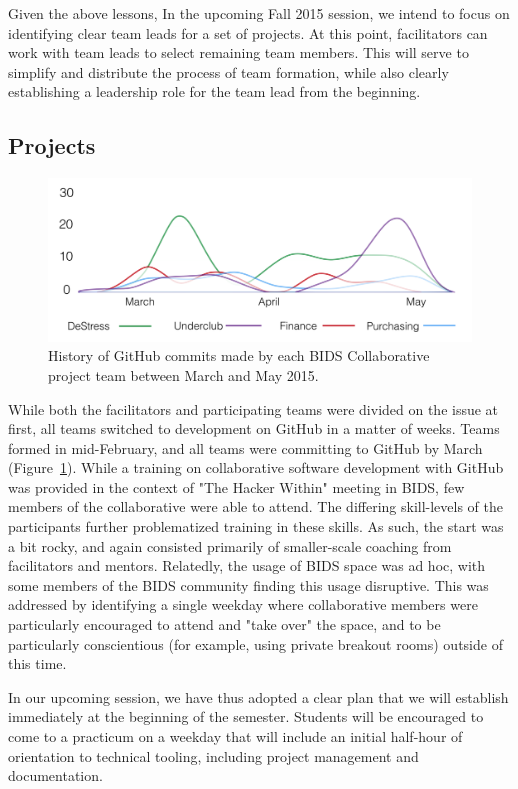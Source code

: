 \documentclass{sig-alternate}
\begin{document}
Given the above lessons, In the upcoming Fall 2015 session, we intend to focus on identifying clear team leads for a set of projects. At this point, facilitators can work with team leads to select remaining team members. This will serve to simplify and distribute the process of team formation, while also clearly establishing a leadership role for the team lead from the beginning.

\subsection{Projects}

\begin{figure}
\centerline{\includegraphics[scale=0.27]{dsc_figure_gitcommits.png}}
\caption{History of GitHub commits made by each BIDS Collaborative project team between March and May 2015.}
\label{fig:gitcommits}
\end{figure}

While both the facilitators and participating teams were divided on the issue at first, all teams switched to development on GitHub in a matter of weeks. Teams formed in mid-February, and all teams were committing to GitHub by March (Figure~\ref{fig:gitcommits}). While a training on collaborative software development with GitHub was provided in the context of "The Hacker Within" meeting in BIDS, few members of the collaborative were able to attend. The differing skill-levels of the participants further problematized training in these skills. As such, the start was a bit rocky, and again consisted primarily of smaller-scale coaching from facilitators and mentors. Relatedly, the usage of BIDS space was ad hoc, with some members of the BIDS community finding this usage disruptive. This was addressed by identifying a single weekday where collaborative members were particularly encouraged to attend and "take over" the space, and to be particularly conscientious (for example, using private breakout rooms) outside of this time.

In our upcoming session, we have thus adopted a clear plan that we will establish immediately at the beginning of the semester. Students will be encouraged to come to a practicum on a weekday that will include an initial half-hour of orientation to technical tooling, including project management and documentation.
\end{document}
